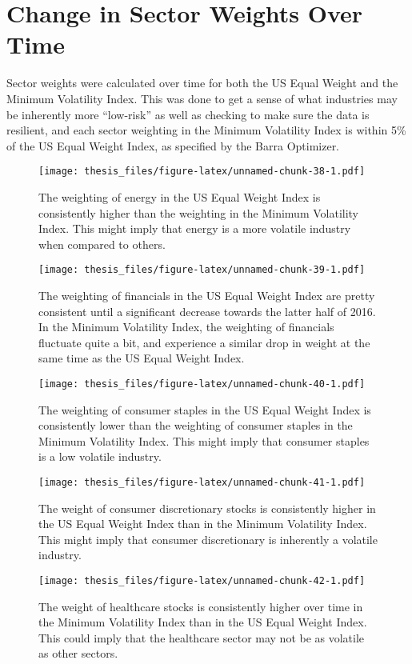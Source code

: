 \documentclass[12pt,twoside]{reedthesis}
\theoremstyle{definition}
\theoremstyle{definition}
\theoremstyle{definition}
\theoremstyle{remark}
\begin{document}
\section{Change in Sector Weights Over
Time}\label{change-in-sector-weights-over-time}

Sector weights were calculated over time for both the US Equal Weight
and the Minimum Volatility Index. This was done to get a sense of what
industries may be inherently more ``low-risk'' as well as checking to
make sure the data is resilient, and each sector weighting in the
Minimum Volatility Index is within 5\% of the US Equal Weight Index, as
specified by the Barra Optimizer.
\begin{figure}[htbp]
\centering
\texttt{[image: thesis\_files/figure-latex/unnamed-chunk-38-1.pdf]}
\caption{\label{fig:unnamed-chunk-38}The weighting of energy in the US Equal
Weight Index is consistently higher than the weighting in the Minimum
Volatility Index. This might imply that energy is a more volatile
industry when compared to others.}
\end{figure}
\begin{figure}[htbp]
\centering
\texttt{[image: thesis\_files/figure-latex/unnamed-chunk-39-1.pdf]}
\caption{\label{fig:unnamed-chunk-39}The weighting of financials in the US
Equal Weight Index are pretty consistent until a significant decrease
towards the latter half of 2016. In the Minimum Volatility Index, the
weighting of financials fluctuate quite a bit, and experience a similar
drop in weight at the same time as the US Equal Weight Index.}
\end{figure}
\begin{figure}[htbp]
\centering
\texttt{[image: thesis\_files/figure-latex/unnamed-chunk-40-1.pdf]}
\caption{\label{fig:unnamed-chunk-40}The weighting of consumer staples in
the US Equal Weight Index is consistently lower than the weighting of
consumer staples in the Minimum Volatility Index. This might imply that
consumer staples is a low volatile industry.}
\end{figure}
\begin{figure}[htbp]
\centering
\texttt{[image: thesis\_files/figure-latex/unnamed-chunk-41-1.pdf]}
\caption{\label{fig:unnamed-chunk-41}The weight of consumer discretionary
stocks is consistently higher in the US Equal Weight Index than in the
Minimum Volatility Index. This might imply that consumer discretionary
is inherently a volatile industry.}
\end{figure}
\begin{figure}[htbp]
\centering
\texttt{[image: thesis\_files/figure-latex/unnamed-chunk-42-1.pdf]}
\caption{\label{fig:unnamed-chunk-42}The weight of healthcare stocks is
consistently higher over time in the Minimum Volatility Index than in
the US Equal Weight Index. This could imply that the healthcare sector
may not be as volatile as other sectors.}
\end{figure}
\end{document}
